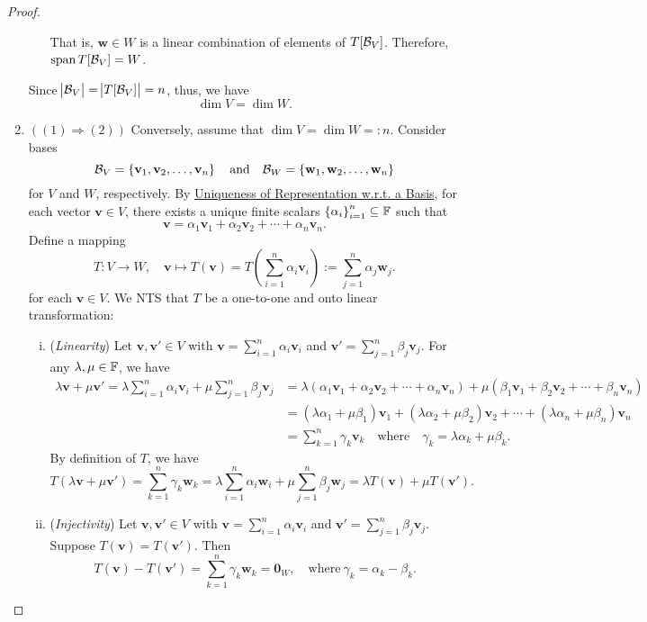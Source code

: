 \documentclass[11pt,openany]{article}
\renewcommand{\vec}[1]{\mathbf{#1}}
\begin{document}
\begin{proof}
\begin{enumerate}[]
\begin{itemize}
\[		\] That is, $\vec{w}\in W$ is a linear combination of elements of $T[\mathcal{B}_V]$. Therefore, $\operatorname{\normalfont span} T[\mathcal{B}_V]=W$.
	\end{itemize} Since $
	\abs[1]{\mathcal{B}_V}=\abs[1]{T[\mathcal{B}_V]}=n$, thus, we have \[
	\dim V=\dim W.
	\]
	\item $((1)\Rightarrow (2))$  Conversely, assume that $\dim V=\dim W =:n.$ Consider bases \[
	\basis_V=\set{\vec{v}_1,\vec{v}_2,\dots,\vec{v}_n}\quad\text{and}\quad\basis_W=\set{\vec{w}_1,\vec{w}_2,\dots,\vec{w}_n}
	\] for $V$ and $W$, respectively. By \hyperlink{unique-wrt-basis}{Uniqueness of Representation w.r.t. a Basis}, for each vector $\vec{v}\in V$, there exists a unique finite scalars $\set{\alpha_i}_{i=1}^n\subseteq \mathbb{F}$ such that \[
	\vec{v}=\alpha_1\vec{v}_1+\alpha_2\vec{v}_2+\cdots+\alpha_n\vec{v}_n.
	\] Define a mapping \[
	T:V\to W,\quad \vec{v}\mapsto T(\vec{v})=T\left(\sum_{i=1}^n\alpha_i\vec{v}_i\right):=\sum_{j=1}^n\alpha_j\vec{w}_j.
	\] for each $\vec{v}\in V$. We NTS that $T$ be a one-to-one and onto linear transformation: \begin{enumerate}[(i)]
		\item (\textit{Linearity}) Let $\vec{v},\vec{v}'\in V$ with $\vec{v}=\sum_{i=1}^n\alpha_i\vec{v}_i$ and $\vec{v}'=\sum_{j=1}^n\beta_j\vec{v}_j$. For any $\lambda,\mu\in\mathbb{F}$, we have \begin{align*}
		\lambda\vec{v}+\mu\vec{v}'=\lambda\sum_{i=1}^{n}\alpha_i\vec{v}_i+\mu\sum_{j=1}^{n}\beta_j\vec{v}_j
		&=\lambda(\alpha_1\vec{v}_1+\alpha_2\vec{v}_2+\cdots+\alpha_n\vec{v}_n)+\mu(\beta_1\vec{v}_1+\beta_2\vec{v}_2+\cdots+\beta_n\vec{v}_n)\\
		&=(\lambda\alpha_1+\mu\beta_1)\vec{v}_1+(\lambda\alpha_2+\mu\beta_2)\vec{v}_2+\cdots+(\lambda\alpha_n+\mu\beta_n)\vec{v}_n\\
		&=\sum_{k=1}^{n}\gamma_k\vec{v}_k\quad\text{where}\quad\gamma_k=
		\lambda\alpha_k+\mu\beta_k.
		\end{align*} By definition of $T$, we have \[
		T(\lambda\vec{v}+\mu\vec{v}')=\sum_{k=1}^{n}\gamma_k\vec{w}_k=\lambda\sum_{i=1}^{n}\alpha_i\vec{w}_i+\mu\sum_{j=1}^{n}\beta_j\vec{w}_j=\lambda T(\vec{v})+\mu T(\vec{v}').
		\]\vspace{20pt}
		\item (\textit{Injectivity}) Let $\vec{v},\vec{v}'\in V$ with $\vec{v}=\sum_{i=1}^n\alpha_i\vec{v}_i$ and $\vec{v}'=\sum_{j=1}^n\beta_j\vec{v}_j$. Suppose $T(\vec{v})=T(\vec{v}')$. Then \[
		T(\vec{v})-T(\vec{v}')=\sum_{k=1}^{n}\gamma_k\vec{w}_k=\vec{0}_W,\quad\text{where}\ \gamma_k=\alpha_k-\beta_k.
\]
\end{enumerate}
\end{enumerate}
\end{proof}
\end{document}
